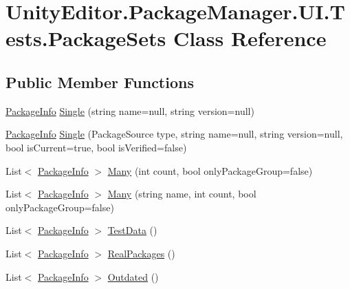 \hypertarget{class_unity_editor_1_1_package_manager_1_1_u_i_1_1_tests_1_1_package_sets}{}\section{Unity\+Editor.\+Package\+Manager.\+U\+I.\+Tests.\+Package\+Sets Class Reference}
\label{class_unity_editor_1_1_package_manager_1_1_u_i_1_1_tests_1_1_package_sets}
\subsection*{Public Member Functions}
\begin{DoxyCompactItemize}
\item 
\mbox{\hyperlink{class_unity_editor_1_1_package_manager_1_1_u_i_1_1_package_info}{Package\+Info}} \mbox{\hyperlink{class_unity_editor_1_1_package_manager_1_1_u_i_1_1_tests_1_1_package_sets_a7a674621cd6993b95bf2f727f713bf62}{Single}} (string name=null, string version=null)
\item 
\mbox{\hyperlink{class_unity_editor_1_1_package_manager_1_1_u_i_1_1_package_info}{Package\+Info}} \mbox{\hyperlink{class_unity_editor_1_1_package_manager_1_1_u_i_1_1_tests_1_1_package_sets_ace327849f2fab008bcd128f87d94e898}{Single}} (Package\+Source type, string name=null, string version=null, bool is\+Current=true, bool is\+Verified=false)
\item 
List$<$ \mbox{\hyperlink{class_unity_editor_1_1_package_manager_1_1_u_i_1_1_package_info}{Package\+Info}} $>$ \mbox{\hyperlink{class_unity_editor_1_1_package_manager_1_1_u_i_1_1_tests_1_1_package_sets_a86750fa77ba04573c7eaa5d605576a6a}{Many}} (int count, bool only\+Package\+Group=false)
\item 
List$<$ \mbox{\hyperlink{class_unity_editor_1_1_package_manager_1_1_u_i_1_1_package_info}{Package\+Info}} $>$ \mbox{\hyperlink{class_unity_editor_1_1_package_manager_1_1_u_i_1_1_tests_1_1_package_sets_a29c323e3040bc3e0d70b26f76d72a50c}{Many}} (string name, int count, bool only\+Package\+Group=false)
\item 
List$<$ \mbox{\hyperlink{class_unity_editor_1_1_package_manager_1_1_u_i_1_1_package_info}{Package\+Info}} $>$ \mbox{\hyperlink{class_unity_editor_1_1_package_manager_1_1_u_i_1_1_tests_1_1_package_sets_a17745e089c0a282188b9de778eb9a8b8}{Test\+Data}} ()
\item 
List$<$ \mbox{\hyperlink{class_unity_editor_1_1_package_manager_1_1_u_i_1_1_package_info}{Package\+Info}} $>$ \mbox{\hyperlink{class_unity_editor_1_1_package_manager_1_1_u_i_1_1_tests_1_1_package_sets_ad9930d9a3808998a21b66f8df56f82f1}{Real\+Packages}} ()
\item 
List$<$ \mbox{\hyperlink{class_unity_editor_1_1_package_manager_1_1_u_i_1_1_package_info}{Package\+Info}} $>$ \mbox{\hyperlink{class_unity_editor_1_1_package_manager_1_1_u_i_1_1_tests_1_1_package_sets_a726ae3618e67b2bda58f75ac7e6e38e2}{Outdated}} ()
\end{DoxyCompactItemize}
